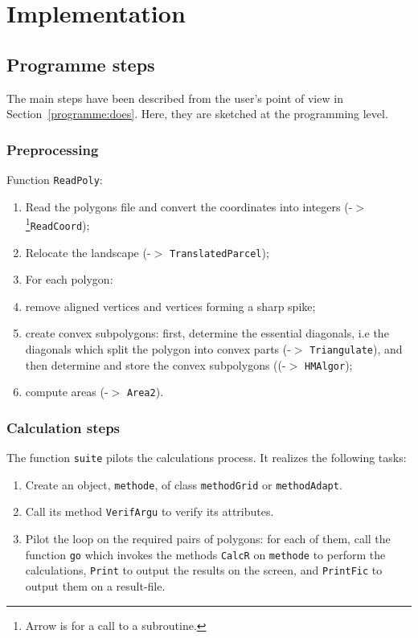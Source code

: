 \chapter{Implementation}

\section{Programme steps}

The main  steps have been described from the user's point of view
in Section~\ref{programme:does}.
Here, they are sketched
at the programming level. 



\subsection{Preprocessing}
Function \texttt{ReadPoly}:
\begin{enumerate}
\item
Read the polygons file and 
convert the coordinates into integers (-$>$\footnote{\label{ffr}Arrow is
  for a call to a subroutine.}\texttt {ReadCoord});
\item
Relocate the landscape (-$>$ \texttt {TranslatedParcel});
\item
For each polygon:
\enumerate
\item
remove aligned vertices and vertices forming a sharp spike;
\item
create convex subpolygons:
first, determine the essential diagonals, i.e
the diagonals which split the polygon into convex parts 
(-$>$ \texttt {Triangulate}),
 and then determine and store the convex subpolygons ((-$>$  \texttt  {HMAlgor}); 
\item
compute areas   (-$>$ \texttt {Area2}).
\end{enumerate}

\subsection{Calculation steps}

The function \texttt{suite} pilots the calculations process.
It realizes the following tasks:
\begin{enumerate}
\item
Create an object, \texttt {methode}, of class \texttt {methodGrid}
or \texttt {methodAdapt}.
\item
Call its method \texttt {VerifArgu} to verify its attributes.
\item
Pilot the loop on the required pairs of polygons:
for each of them, call the function \texttt {go}
which invokes
the methods \texttt {CalcR}
on  \texttt {methode} to perform the calculations,
\texttt {Print} to output the results on the screen,
and \texttt {PrintFic} to output them on a result-file.

\end{enumerate}

